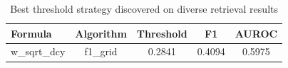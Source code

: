 \begin{table}[ht]
\centering
\caption{Best threshold strategy discovered on diverse retrieval results}
\label{tab:threshold_best}
\begin{tabular}{@{}lcccc@{}}
\toprule
Formula & Algorithm & Threshold & F1 & AUROC \\
\midrule
w\_sqrt\_dcy & f1\_grid & 0.2841 & 0.4094 & 0.5975 \\
\bottomrule
\end{tabular}
\end{table}
